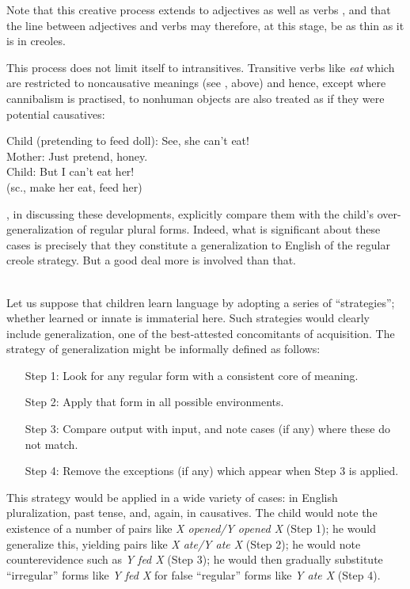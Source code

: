 \noindent Note that this creative process extends to adjectives as well as verbs , and that the line between adjectives and verbs may therefore, at this stage, be as thin as it is in creoles.

This process does not limit itself to intransitives. Transitive verbs like \textit{eat} which are restricted to noncausative meanings (see ,  above) and hence, except where cannibalism is practised, to nonhuman objects are also treated as if they were potential causatives:

\ea\label{ex:3:81}
Child (pretending to feed doll): See, she can't eat!\\
Mother: Just pretend, honey.\\
Child: But I can't eat her!\\
(sc., make her eat, feed her)
\z

\citet[511]{ClarkEtAl1977}, in discussing these developments, explicitly compare them with the child's over-generalization of regular plural forms. Indeed, what is significant about these cases is precisely that they constitute a generalization to English of the regular creole strategy. But a good deal more is involved than that.\\\\

Let us suppose that children learn language by adopting a series of ``strategies''; whether learned or innate is immaterial here. Such
strategies would clearly include generalization, one of the best-attested concomitants of acquisition. The strategy of generalization might be informally defined as follows:

\begin{enumerate}
\item[Step 1:]Look for any regular form with a consistent core of meaning.
\item[Step 2:]Apply that form in all possible environments.
\item[Step 3:]Compare output with input, and note cases (if any) where these do not match.
\item[Step 4:]Remove the exceptions (if any) which appear when Step 3 is applied.
\end{enumerate}

This strategy would be applied in a wide variety of cases: in English pluralization, past tense, and, again, in causatives. The child would note the existence of a number of pairs like \textit{X opened/Y opened X} (Step 1); he would generalize this, yielding pairs like \textit{X ate/Y ate X} (Step 2); he would note counterevidence such as \textit{Y fed X} (Step 3); he would then gradually substitute ``irregular'' forms like \textit{Y fed X} for false ``regular'' forms like \textit{Y ate X} (Step 4).

